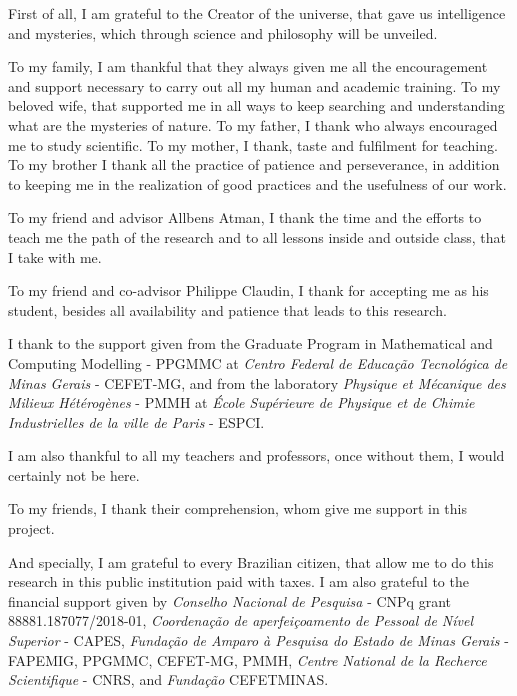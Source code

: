 
\begin{agradecimentos}[Acknowledgements]

First of all, I am grateful to the Creator of the universe, that gave us intelligence and mysteries, which through science and philosophy will be unveiled.

To my family, I am thankful that they always given me all the encouragement and support necessary to carry out all my human and academic training. To my beloved wife, that supported me in all ways to keep searching and understanding what are the mysteries of nature. To my father, I thank who always encouraged me to study scientific. To my mother, I thank, taste and fulfilment for teaching. To my brother I thank all the practice of patience and perseverance, in addition to keeping me in the realization of good practices and the usefulness of our work.

To my friend and advisor Allbens Atman, I thank the time and the efforts to teach me the path of the research and to all lessons inside and outside class, that I take with me.

To my friend and co-advisor Philippe Claudin, I thank for accepting me as his student, besides all availability and patience that leads to this research.

I thank to the support given from the Graduate Program in Mathematical and Computing Modelling - PPGMMC at \textit{Centro Federal de Educação Tecnológica de Minas Gerais} - CEFET-MG, and from the laboratory \textit{Physique et Mécanique des Milieux Hétérogènes} - PMMH at \textit{École Supérieure de Physique et de Chimie Industrielles de la ville de Paris} - ESPCI.

I am also thankful to all my teachers and professors, once without them, I would certainly not be here.

To my friends, I thank their comprehension, whom give me support in this project.

And specially, I am grateful to every Brazilian citizen, that allow me to do this research in this public institution paid with taxes. I am also grateful to the financial support given by \textit{Conselho Nacional de Pesquisa} - CNPq grant 88881.187077/2018-01, \textit{Coordenação de aperfeiçoamento de Pessoal de Nível Superior} - CAPES, \textit{Fundação de Amparo à Pesquisa do Estado de Minas Gerais} - FAPEMIG, PPGMMC, CEFET-MG, PMMH, \textit{Centre National de la Recherce Scientifique} - CNRS, and \textit{Fundação} CEFETMINAS.


\end{agradecimentos}

